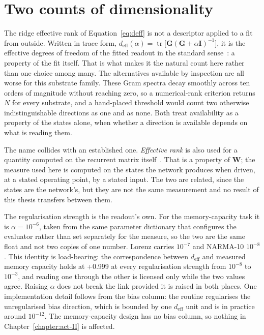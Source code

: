 \section{Two counts of dimensionality}
\label{sec:methods-counts}
\bigskip

The ridge effective rank of Equation~\ref{eq:deff} is not a descriptor applied to
a fit from outside. Written in trace form,
$d_{\mathrm{eff}}(\alpha) = \operatorname{tr}\bigl[\mathbf{G}(\mathbf{G} + \alpha \mathbf{I})^{-1}\bigr]$,
it is the effective degrees of freedom of the fitted readout in the standard
sense~\cite{hastie2009elements}: a property of the fit itself. That is what makes
it the natural count here rather than one choice among many. The alternatives
available by inspection are all worse for this substrate family. These Gram
spectra decay smoothly across ten orders of magnitude without reaching zero, so a
numerical-rank criterion returns $N$ for every substrate, and a hand-placed
threshold would count two otherwise indistinguishable directions as one and as
none. Both treat availability as a property of the states alone, when whether a
direction is available depends on what is reading them.

The name collides with an established one. \emph{Effective rank} is also used for
a quantity computed on the recurrent matrix
itself~\cite{clark2025connectivity}. That is a property of $\mathbf{W}$; the measure used
here is computed on the states the network produces when driven, at a stated
operating point, by a stated input. The two are related, since the states are the
network's, but they are not the same measurement and no result of this thesis
transfers between them.

The regularisation strength is the readout's own. For the memory-capacity task it
is $\alpha = 10^{-6}$, %
taken from the same parameter dictionary that configures the evaluator rather
than set separately for the measure, so the two are the same float and not two
copies of one number. Lorenz carries
$10^{-7}$ and NARMA-10 $10^{-8}$. %
This identity is load-bearing: the correspondence between $d_{\mathrm{eff}}$ and
measured memory capacity holds at
+0.999 %
at every regularisation strength from $10^{-8}$ to $10^{-3}$, and reading one
through the other is licensed only while the two values agree. Raising $\alpha$
does not break the link provided it is raised in both places. One implementation
detail follows from the bias column: the routine regularises the unregularised
bias direction, which is bounded by
one $d_{\mathrm{eff}}$ unit %
and is in practice around $10^{-12}$. The memory-capacity design has no bias
column, so nothing in Chapter~\ref{chapter:act-II} is affected.

